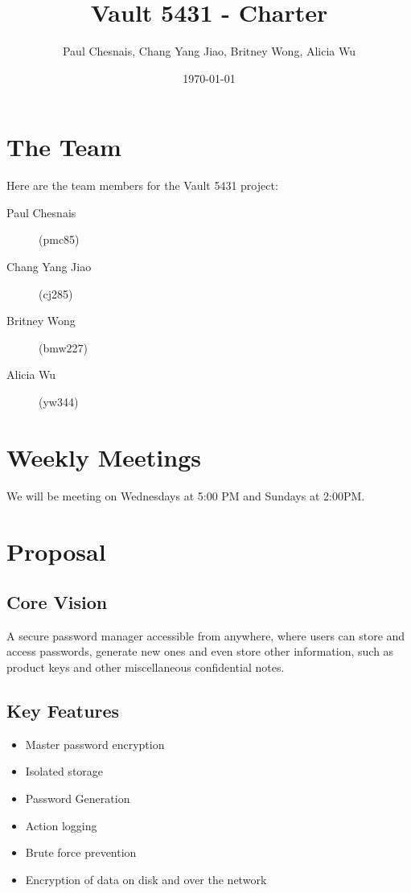 \documentclass{article}
\title{Vault 5431 - Charter}
\author{Paul Chesnais, Chang Yang Jiao, Britney Wong, Alicia Wu}
\date{\today}
\begin{document}
\maketitle
\thispagestyle{empty}

\section{The Team}
\label{sec:the_team}

Here are the team members for the Vault 5431 project:
\begin{description}
  \item[Paul Chesnais] (pmc85)
  \item[Chang Yang Jiao] (cj285)
  \item[Britney Wong] (bmw227)
  \item[Alicia Wu] (yw344)
\end{description}

\section{Weekly Meetings}
\label{sec:weekly_meetings}
We will be meeting on Wednesdays at 5:00 PM and Sundays at 2:00PM.

\section{Proposal}
\label{sec:proposal}

\subsection{Core Vision}
\label{sub:core_vision}

A secure password manager accessible from anywhere, where users can store and access passwords, generate new ones and even store other information, such as product keys and other miscellaneous confidential notes.

\subsection{Key Features}
\label{sub:key_features}
\begin{itemize}
  \item Master password encryption %
  \item Isolated storage %
  \item Password Generation
  \item Action logging %
  \item Brute force prevention %
  \item Encryption of data on disk and over the network %
\end{itemize}
\end{document}
